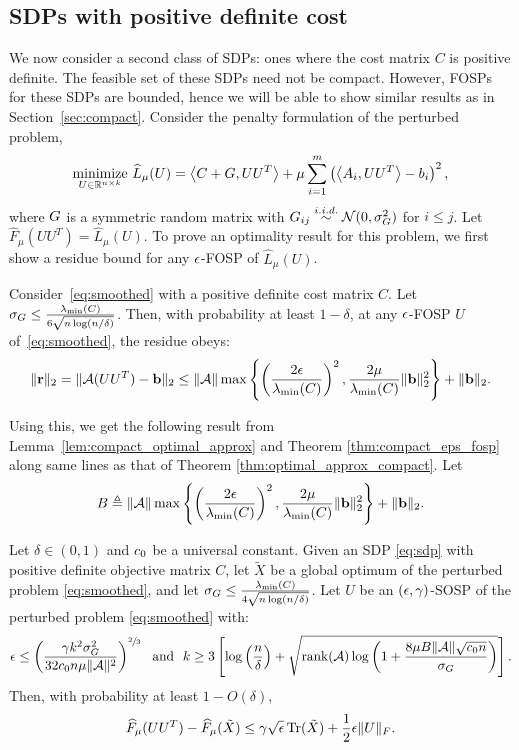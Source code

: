 \subsection{SDPs with positive definite cost}\label{sec:pd}
We now consider a second class of SDPs: ones where the cost matrix $C$ is positive definite. The feasible set of these SDPs need not be compact. However, FOSPs for these SDPs are bounded, hence we will be able to show similar results as in Section~\ref{sec:compact}. Consider the penalty formulation of the perturbed problem,
\begin{align}
\underset{U \in \mathbb{R}^{n \times k}}{\text{minimize}} ~ \widehat L_{\mu}(U) =  \left\langle C+G, UU^T \right\rangle+\mu \sum_{i=1}^m \left(\left\langle A_i, UU^T \right\rangle - b_i\right)^2,
\label{eq:smoothed}
\end{align}
where $G$ is a symmetric random matrix with $G_{ij} \stackrel{i.i.d.}{\sim} \mathcal{N}(0,\sigma_G^2)$ for $i\leq j$. Let $\widehat F_{\mu}(UU^T) = \widehat L_{\mu} (U)$. To prove an optimality result for this problem, we first show a residue bound for any $\epsilon$-FOSP of $\widehat L_{\mu}(U)$.
\begin{lemma}\label{lem:residues}
Consider~\eqref{eq:smoothed} with a positive definite cost matrix $C$. Let $\sigma_G \leq \frac{\lambda_{\min}(C)}{6\sqrt{n \log(n/ \delta)}}$. Then, with probability at least $1-\delta$, at any $\epsilon$-FOSP $U$ of~\eqref{eq:smoothed}, the residue obeys:
$$
	\|\mathbf{r}\|_2 =\|\mathcal{A}(UU^T) -\mathbf{b}\|_2 \leq \|\mathcal{A}\| \max \left \{ \left( \frac{2\epsilon} {\lambda_{\min}(C)}\right)^2, \frac{2\mu}{\lambda_{\min}(C)} \|\mathbf{b}\|_2^2 \right \}+\|\mathbf{b}\|_2.
$$ 
\end{lemma}


Using this, we get the following result from Lemma~\ref{lem:compact_optimal_approx} and Theorem \ref{thm:compact_eps_fosp}  along same lines as that of Theorem \ref{thm:optimal_approx_compact}.
Let $$B \triangleq \|\mathcal{A}\| \max \left \{ \left( \frac{2\epsilon} {\lambda_{\min}(C)}\right)^2, \frac{2\mu}{\lambda_{\min}(C)} \|\mathbf{b}\|_2^2 \right \}+\|\mathbf{b}\|_2.$$
\begin{theorem}\label{thm:optimal_approx}
Let $\delta \in (0, 1)$ and $c_0$ be a universal constant. Given an SDP \eqref{eq:sdp} with positive definite objective matrix $C$, let $\tilde X $ be a global optimum of the perturbed problem \eqref{eq:smoothed}, and let $\sigma_G \leq \frac{\lambda_{\min}(C)}{4\sqrt{n \log(n/ \delta)}}$. Let $U$ be an $(\epsilon, \gamma)$-SOSP of the perturbed problem \eqref{eq:smoothed} with:
\begin{align*}
	\epsilon \leq \left(\frac{\gamma k^2 \sigma_G^2 }{ 32c_0 n  \mu \|\mathcal{A}\|^2}\right)^{\sfrac{2}{3}} ~\text{ and }~ k \geq 3\left[\log\left(\frac{n}{\delta}\right) + \sqrt{ \operatorname{rank}(\mathcal{A})   \log \left(1 +\frac{8 \mu B\|\mathcal{A}\|\sqrt{c_0 n} }{\sigma_G }  \right) }  \right].
\end{align*}
Then, with probability at least $1-O(\delta)$,
\begin{align*}
	\widehat F_{\mu}(UU^T)  - \widehat F_{\mu}(\tilde X)  \leq \gamma \sqrt{\epsilon} \operatorname{Tr}(\tilde X) +\frac{1}{2}\epsilon \|U\|_F.
\end{align*}
\end{theorem}

